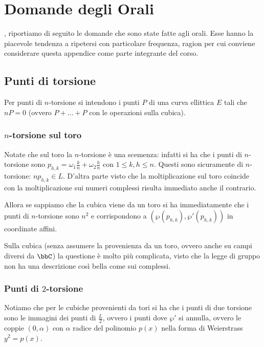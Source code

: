 \chapter{Domande degli Orali}
\justify

, riportiamo di seguito le domande che sono state fatte agli orali.
Esse hanno la piacevole tendenza a ripetersi con particolare frequenza, ragion per cui conviene considerare questa appendice come parte integrante del corso.

\section{Punti di torsione}
Per punti di $n$-torsione si intendono i punti $P$ di una curva ellittica $E$ tali che $nP = 0$ (ovvero $P + \ldots + P$ con le operazioni sulla cubica).

\subsection{$n$-torsione sul toro}
Notate che sul toro la $n$-torsione è una scemenza: infatti si ha che i punti di $n$-torsione sono $p_{h, k} = \omega_1 \frac{k}{n} + \omega_2 \frac{h}{n}$ con $1 \le k, h \le n$.
Questi sono sicuramente di $n$-torsione: $n p_{h, k} \in L$. D'altra parte visto che la moltiplicazione sul toro coincide con la moltiplicazione sui numeri complessi risulta immediato anche il contrario.

Allora se sappiamo che la cubica viene da un toro si ha immediatamente che i punti di $n$-torsione sono $n^2$ e corrispondono a $(\wp(p_{h, k}), \wp'(p_{h, k}))$ in coordinate affini.

Sulla cubica (senza assumere la provenienza da un toro, ovvero anche su campi diversi da $\bbC$) la questione è molto più complicata, visto che la legge di gruppo non ha una descrizione così bella come sui complessi.

\subsection{Punti di $2$-torsione}
Notiamo che per le cubiche provenienti da tori si ha che i punti di due torsione sono le immagini dei punti di $\frac{L}{2}$, ovvero i punti dove $\wp'$ si annulla, ovvero le coppie $(0, \alpha)$ con $\alpha$ radice del polinomio $p(x)$ nella forma di Weierstrass $y^2 = p(x)$.

